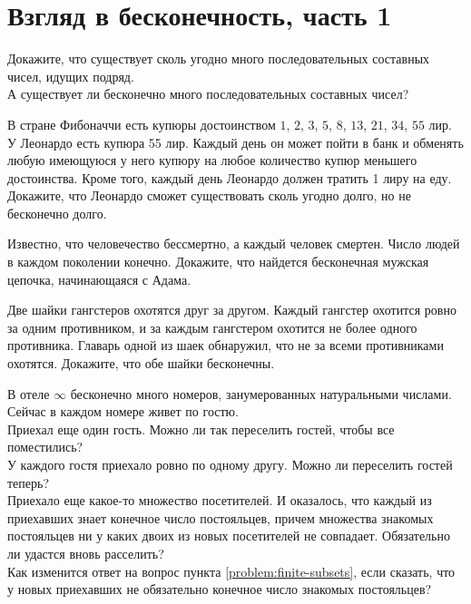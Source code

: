 

\section*{Взгляд в бесконечность, часть 1}


\begin{problems}

\item
\sbp
Докажите, что существует сколь угодно много последовательных составных чисел,
идущих подряд.
\\
\sbp
А существует ли бесконечно много последовательных составных чисел?

\item
В стране Фибоначчи есть купюры достоинством
$1$, $2$, $3$, $5$, $8$, $13$, $21$, $34$, $55$ лир.
У Леонардо есть купюра 55 лир.
Каждый день он может пойти в банк и обменять любую имеющуюся у него купюру на
любое количество купюр меньшего достоинства.
Кроме того, каждый день Леонардо должен тратить 1 лиру на еду.
Докажите, что Леонардо сможет существовать сколь угодно долго, но не бесконечно
долго.

\item
Известно, что человечество бессмертно, а каждый человек смертен.
Число людей в каждом поколении конечно.
Докажите, что найдется бесконечная мужская цепочка, начинающаяся с Адама.

\item
Две шайки гангстеров охотятся друг за другом.
Каждый гангстер охотится ровно за одним противником, и за каждым гангстером
охотится не более одного противника.
Главарь одной из шаек обнаружил, что не за всеми противниками охотятся.
Докажите, что обе шайки бесконечны.

\item В отеле $\infty$ бесконечно много номеров, занумерованных натуральными
числами.
Сейчас в каждом номере живет по гостю.
\\
\sbp
Приехал еще один гость.
Можно ли так переселить гостей, чтобы все поместились?
\\
\sbp
У каждого гостя приехало ровно по одному другу.
Можно ли переселить гостей теперь?
\\
\sbp\label{problem:finite-subsets}%
Приехало еще какое-то множество посетителей.
И оказалось, что каждый из приехавших знает конечное число постояльцев, причем
множества знакомых постояльцев ни у каких двоих из новых посетителей не
совпадает. Обязательно ли удастся вновь расселить?
\\
\sbp
Как изменится ответ на вопрос пункта \ref{problem:finite-subsets}, если
сказать, что у новых приехавших не обязательно конечное число знакомых
постояльцев?


\end{problems}
